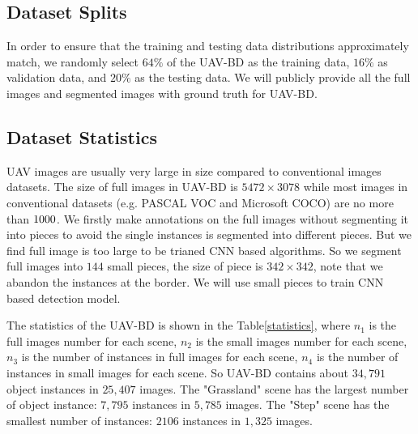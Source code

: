 \subsection{Dataset Splits}

In order to ensure that the training and testing data distributions approximately match, we randomly select $ 64\% $ of the UAV-BD as the training data, $ 16\% $ as validation data, and $ 20\% $ as the testing data. We will publicly provide all the full images and segmented images with ground truth for UAV-BD.



\subsection{Dataset Statistics}
\label{ssec:Dataset_Statistics}
UAV images are usually very large in size compared to conventional images datasets. The size of full images in UAV-BD is $ 5472\times 3078 $ while most images in conventional datasets (e.g. PASCAL VOC and Microsoft COCO) are no more than $ 1000 \time 1000 $\cite{RCNNforSmall}. We firstly make annotations on the full images without segmenting it into pieces to avoid the single instances is segmented into different pieces. But we find full image is too large to be trianed CNN based algorithms. So we segment full images into $ 144 $ small pieces, the size of piece is $ 342\times 342 $, note that we abandon the instances at the border. We will use small pieces to train CNN based detection model. 


The statistics of the UAV-BD is shown in the Table\ref{statistics}, where $ n_1 $ is the full images number for each scene, $ n_2 $ is the small images number for each scene, $ n_3 $ is the number of instances in full images for each scene, $ n_4 $ is the number of instances in small images for each scene. So UAV-BD contains about $ 34,791 $ object instances in $ 25,407 $ images. The "Grassland" scene has the largest number of object instance: $ 7,795 $ instances in $ 5,785 $ images. The "Step" scene has the smallest number of instances: $ 2106 $ instances in $ 1,325 $ images.



